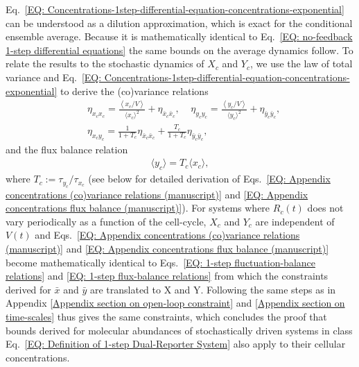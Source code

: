 \documentclass[%
 reprint,prx,
superscriptaddress,
%
%
%
%
%
%
%
%
%
 amsmath,amssymb,
 aps,
%
%
%
%
%
%
]{revtex4-2}
\begin{document}
{{Eq.~\eqref{EQ: Concentrations-1step-differential-equation-concentrations-exponential} can be understood as a dilution approximation, which is exact for the conditional ensemble average. Because it is mathematically identical to Eq.~\eqref{EQ: no-feedback 1-step differential equations} the same bounds on the average dynamics follow. To relate the results to the stochastic dynamics of $X_{c}$ and $Y_{c}$, we use the law of total variance and Eq.~\eqref{EQ: Concentrations-1step-differential-equation-concentrations-exponential} to derive the (co)variance relations
\begin{align}
    &\eta_{x_{c}x_{c}} =  \frac{\left \langle x_{c}/V \right \rangle}{\langle x_{c} \rangle^{2}} + \eta_{\bar{x}_{c}\bar{x}_{c}},  \; \; \; \; \eta_{y_{c}y_{c}} =  \frac{\left \langle y_{c}/V \right \rangle}{\langle y_{c} \rangle^{2}} + \eta_{\bar{y}_{c}\bar{y}_{c}}, \nonumber \\
    &\eta_{x_{c}y_{c}} = \frac{1}{1+T_{c}}\eta_{\bar{x}_{c}\bar{x}_{c}} + \frac{T_{c}}{1 + T_{c}}\eta_{\bar{y}_{c}\bar{y}_{c}},
\label{EQ: Appendix concentrations (co)variance relations (manuscript)}
\end{align}
%
%
%
%
%
%
%
and the flux balance relation
\begin{align}
    \langle y_{c} \rangle = T_{c}\langle x_{c} \rangle,
\label{EQ: Appendix concentrations flux balance (manuscript)}
\end{align}
where $T_{c} := \tau_{y_{c}}/\tau_{x_{c}}$ (see below for detailed derivation of Eqs.~\eqref{EQ: Appendix concentrations (co)variance relations (manuscript)} and \eqref{EQ: Appendix concentrations flux balance (manuscript)}). For systems where $R_{c}(t)$ does not vary periodically as a function of the cell-cycle,
$X_{c}$ and $Y_{c}$ are independent of $V(t)$
%
and Eqs.~\eqref{EQ: Appendix concentrations (co)variance relations (manuscript)} and \eqref{EQ: Appendix concentrations flux balance (manuscript)} become mathematically identical to Eqs.~\eqref{EQ: 1-step fluctuation-balance relations} and \eqref{EQ: 1-step flux-balance relations} from which the constraints derived for $\bar{x}$ and $\bar{y}$ are translated to X and Y. Following the same steps as in Appendix \ref{Appendix section on open-loop constraint} and \ref{Appendix section on time-scales} thus gives the same constraints, which concludes the proof that bounds derived for molecular abundances of stochastically driven systems in  class Eq.~\eqref{EQ: Definition of 1-step Dual-Reporter System} also apply to their cellular concentrations.
%

}}
\end{document}
